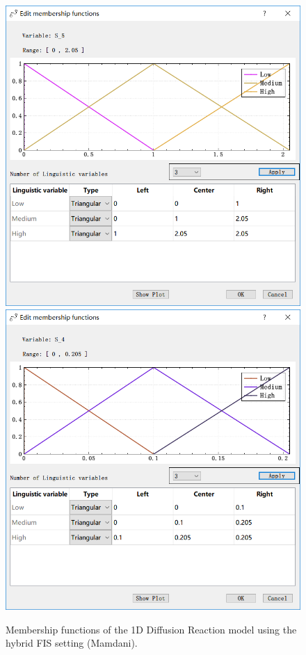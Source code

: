 \documentclass[journal,a4paper,onecolumn]{article}
\begin{document}
\begin{figure}[!hbt]
	\begin{center}
		\includegraphics[width=0.45\columnwidth]{fig36}
		\includegraphics[width=0.45\columnwidth]{fig37}
		\caption{Membership functions of the 1D Diffusion Reaction model using the hybrid FIS setting (Mamdani).}
		\label{fig:Membership functions of 1D Diffusion Reaction using hybrid FIS (Mamdani).}
	\end{center}
\end{figure}
\end{document}
